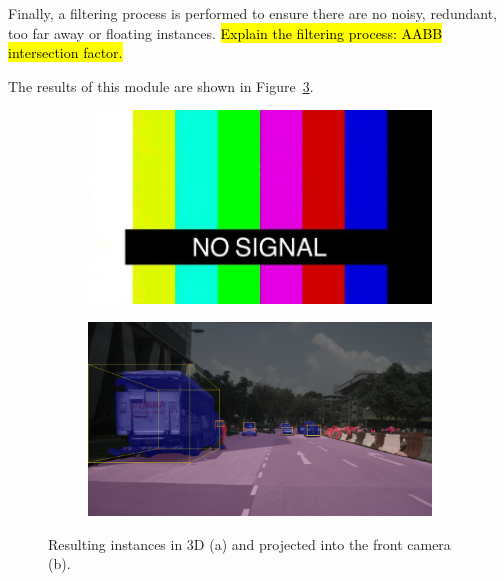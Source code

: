 Finally, a filtering process is performed to ensure there are no noisy, redundant, too far away or floating instances.
\hl{Explain the filtering process: AABB intersection factor.}

The results of this module are shown in Figure~\ref{fig:instance_scene_images}.

\begin{figure}[h!]
    \centering
    \begin{subfigure}[b]{0.45\textwidth}
        \includegraphics[width=\textwidth]{images/shared/no_signal.jpg}
        \caption{}
        \label{fig:instance_scene_images_a}
    \end{subfigure}
    \hfill
    \begin{subfigure}[b]{0.45\textwidth}
        \includegraphics[width=\textwidth]{images/methodology/raw_cuboid_1.png}
        \caption{}
        \label{fig:instance_scene_images_b}
    \end{subfigure}

    \caption{Resulting instances in 3D (a) and projected into the front camera (b).}
    \label{fig:instance_scene_images}
\end{figure}


